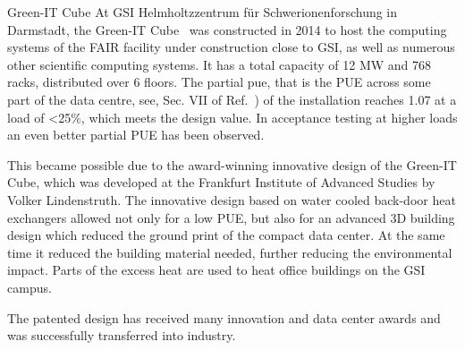 \documentclass[../SustainableHEP.tex]{subfiles}
\begin{document}
\begin{bestpractice}{Green-IT Cube}%
\noindent At  GSI Helmholtzzentrum für Schwerionenforschung in Darmstadt, the Green-IT Cube~\cite{GreenITCube} was constructed in 2014 to host the computing systems of the FAIR facility under construction close to GSI, as well as numerous other scientific computing systems. It has a total capacity of 12 MW and 768 racks, distributed over 6 floors. The partial \acrshort{pue}, that is the PUE across some part of the data centre, see, Sec. VII of Ref.~\cite{GreenGridPUE}) of the installation reaches 1.07 at a load of <25\%, which meets the design value. In acceptance testing at higher loads an even better partial PUE has been observed.
 
This became possible due to the award-winning innovative design of the Green-IT Cube, which was developed at the Frankfurt Institute of Advanced Studies by Volker Lindenstruth. The innovative design based on water cooled back-door heat exchangers allowed not only for a low PUE, but also for an advanced 3D building design which reduced the ground print of the compact data center. At the same time it reduced the building material needed, further reducing the environmental impact. Parts of the excess heat are used to heat office buildings on the GSI campus.
 
The patented design has received many innovation and data center awards and was successfully transferred into industry.
\end{bestpractice}

\end{document}
